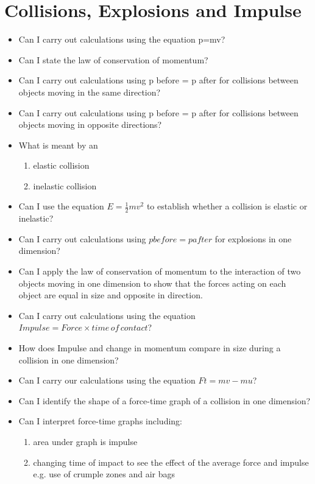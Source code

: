     \section{Collisions, Explosions and Impulse}
    \begin{multicols}{2}
        \begin{itemize}
            \item Can I carry out calculations using the equation p=mv?
            \item Can I state the law of conservation of momentum?
            \item Can I carry out calculations using p before = p after for
                collisions between objects moving in the same direction?
            \item Can I carry out calculations using p before = p after for
                collisions between objects moving in opposite directions?
            \item What is meant by an
                \begin{enumerate}
                    \item elastic collision
                    \item inelastic collision
                \end{enumerate}
            \item Can I use the equation $E = \frac{1}{2}mv^2$ to establish
                whether a collision is elastic or inelastic?
            \item Can I carry out calculations using $p before = p after$ for
                explosions in one dimension?
            \item Can I apply the law of conservation of momentum to the
                interaction of two objects moving in one dimension to
                show that the forces acting on each object are equal in size
                and opposite in direction.
            \item Can I carry out calculations using the equation $Impulse =
                Force \times time\, of\, contact$?
            \item How does Impulse and change in momentum compare in
                size during a collision in one dimension?
            \item Can I carry our calculations using the equation 
                $Ft = mv - mu$?
            \item Can I identify the shape of a force-time graph of a collision
                in one dimension?
            \item Can I interpret force-time graphs including:
                \begin{enumerate}
                    \item area under graph is impulse
                    \item changing time of impact to see the effect of the
                        average force and impulse e.g. use of crumple zones
                        and air bags
                \end{enumerate}
        \end{itemize}
    \end{multicols}

